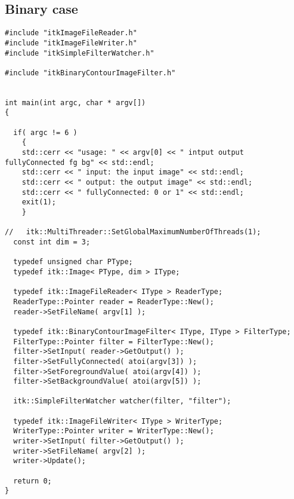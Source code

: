 \documentclass{InsightArticle}
\begin{document}
\subsection{Binary case}

\small \begin{verbatim}
#include "itkImageFileReader.h"
#include "itkImageFileWriter.h"
#include "itkSimpleFilterWatcher.h"

#include "itkBinaryContourImageFilter.h"


int main(int argc, char * argv[])
{

  if( argc != 6 )
    {
    std::cerr << "usage: " << argv[0] << " intput output fullyConnected fg bg" << std::endl;
    std::cerr << " input: the input image" << std::endl;
    std::cerr << " output: the output image" << std::endl;
    std::cerr << " fullyConnected: 0 or 1" << std::endl;
    exit(1);
    }

//   itk::MultiThreader::SetGlobalMaximumNumberOfThreads(1);
  const int dim = 3;
  
  typedef unsigned char PType;
  typedef itk::Image< PType, dim > IType;

  typedef itk::ImageFileReader< IType > ReaderType;
  ReaderType::Pointer reader = ReaderType::New();
  reader->SetFileName( argv[1] );

  typedef itk::BinaryContourImageFilter< IType, IType > FilterType;
  FilterType::Pointer filter = FilterType::New();
  filter->SetInput( reader->GetOutput() );
  filter->SetFullyConnected( atoi(argv[3]) );
  filter->SetForegroundValue( atoi(argv[4]) );
  filter->SetBackgroundValue( atoi(argv[5]) );

  itk::SimpleFilterWatcher watcher(filter, "filter");

  typedef itk::ImageFileWriter< IType > WriterType;
  WriterType::Pointer writer = WriterType::New();
  writer->SetInput( filter->GetOutput() );
  writer->SetFileName( argv[2] );
  writer->Update();

  return 0;
}
\end{verbatim} \normalsize
\end{document}
